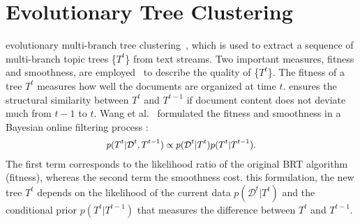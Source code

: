 

\section{Evolutionary Tree Clustering}\label{sec:data}
 evolutionary multi-branch tree clustering~\cite{Wang2013}, which is used to extract a sequence of multi-branch topic trees \{${T^t}$\} from text streams.
Two important measures,  fitness and smoothness, are employed~\cite{Wang2013} to describe the quality of \{${T^t}$\}.
The fitness of a tree $T^t$ measures how well the documents are organized at time $t$.
 ensures the structural similarity between $T^t$ and $T^{t-1}$ if document content does not deviate much from $t-1$ to $t$.
Wang et al.~\cite{Wang2013} formulated the fitness and smoothness in a Bayesian online filtering process :
\begin{equation}\label{eq:learningframework}
\small
\begin{split}
&p(T^t | \mathcal{D}^t, T^{t-1})  \propto  p(\mathcal{D}^t | T^t) p(T^t | T^{t-1}).  \\
\end{split}
\end{equation}
The first term corresponds to the likelihood ratio of the original BRT algorithm~\cite{Blundell2010} (fitness), whereas the second term  the smoothness cost.
 this formulation, the new tree $T^t$ depends on the likelihood of the current data $p(\mathcal{D}^t | T^t)$ and the conditional prior $p(T^t | T^{t-1})$ that measures the difference between $T^t$ and $T^{t-1}$.

